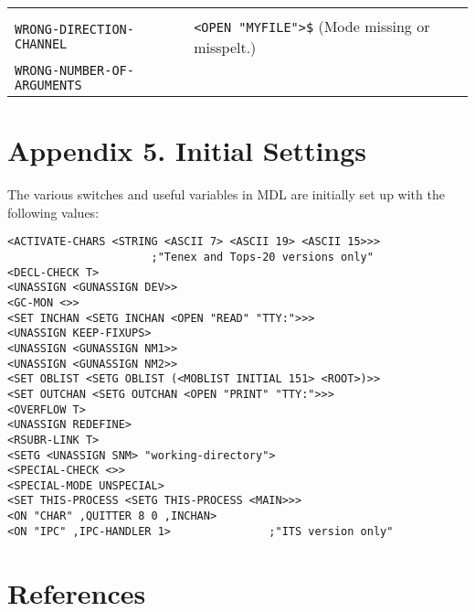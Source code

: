 \documentclass[a4paper,]{article}
\begin{document}
\begin{longtable}[]{@{}ll@{}}
\begin{minipage}[t]{0.36\columnwidth}
\end{minipage}\tabularnewline
\begin{minipage}[t]{0.58\columnwidth}\raggedright\strut
\texttt{WRONG-DIRECTION-CHANNEL}\strut
\end{minipage} & \begin{minipage}[t]{0.36\columnwidth}\raggedright\strut
\texttt{\textless{}OPEN\ "MYFILE"\textgreater{}\$} (Mode missing or misspelt.)\strut
\end{minipage}\tabularnewline
\begin{minipage}[t]{0.58\columnwidth}\raggedright\strut
\texttt{WRONG-NUMBER-OF-ARGUMENTS}\strut
\end{minipage} & \begin{minipage}[t]{0.36\columnwidth}\raggedright\strut
\strut
\end{minipage}\tabularnewline
\bottomrule
\end{longtable}

\section{Appendix 5. Initial Settings}\label{appendix-5.-initial-settings}

The various switches and useful variables in MDL are initially set up with the following values: 
    
 

\begin{verbatim}
<ACTIVATE-CHARS <STRING <ASCII 7> <ASCII 19> <ASCII 15>>>
                      ;"Tenex and Tops-20 versions only"
<DECL-CHECK T>
<UNASSIGN <GUNASSIGN DEV>>
<GC-MON <>>
<SET INCHAN <SETG INCHAN <OPEN "READ" "TTY:">>>
<UNASSIGN KEEP-FIXUPS>
<UNASSIGN <GUNASSIGN NM1>>
<UNASSIGN <GUNASSIGN NM2>>
<SET OBLIST <SETG OBLIST (<MOBLIST INITIAL 151> <ROOT>)>>
<SET OUTCHAN <SETG OUTCHAN <OPEN "PRINT" "TTY:">>>
<OVERFLOW T>
<UNASSIGN REDEFINE>
<RSUBR-LINK T>
<SETG <UNASSIGN SNM> "working-directory">
<SPECIAL-CHECK <>>
<SPECIAL-MODE UNSPECIAL>
<SET THIS-PROCESS <SETG THIS-PROCESS <MAIN>>>
<ON "CHAR" ,QUITTER 8 0 ,INCHAN>
<ON "IPC" ,IPC-HANDLER 1>               ;"ITS version only"
\end{verbatim}

\section{References}\label{references}
\end{document}
